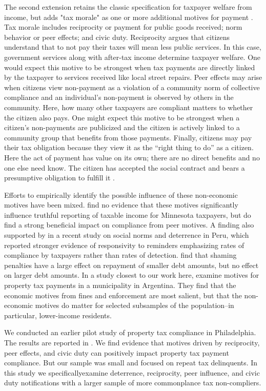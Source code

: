 \documentclass[12pt]{article}
\begin{document}
The second extension retains the classic specification for taxpayer
welfare from income, but adds "tax morale" as one or more additional
motives for payment \cite{Luttmer-14}.  Tax morale includes
reciprocity or payment for public goods received; norm behavior or
peer effects; and civic duty.  Reciprocity argues that citizens
understand that to not pay their taxes will mean less public services.
In this case, government services along with after-tax income
determine taxpayer welfare.  One would expect this motive to be
strongest when tax payments are directly linked by the taxpayer to
services received like local street repairs.  Peer effects may arise
when citizens view non-payment as a violation of a community norm of
collective compliance and an individual's non-payment is observed by
others in the community.  Here, how many other taxpayers are compliant
matters to whether the citizen also pays.  One might
expect this motive to be strongest when a citizen's non-payments are
publicized and the citizen is actively linked to a community group
that benefits from those payments.  Finally, citizens may pay their
tax obligation because they view it as the ``right thing to do'' as a
citizen.  Here the act of payment has value on its own; there are no
direct benefits and no one else need know.  The citizen has accepted
the social contract and bears a presumptive obligation to fulfill it
\cite{Rawls-71}.

Efforts to empirically identify the possible influence of these
non-economic motives have been mixed.   find no
evidence that these motives significantly influence truthful reporting
of taxable income for Minnesota taxpayers, but 
do find a strong beneficial impact on compliance from peer motives.
A finding also supported by  in a recent study on
social norms and deterrence in Peru, which reported stronger 
evidence of responsivity to reminders emphasizing rates of 
compliance by taxpayers rather than rates of detection.
 find that shaming penalties have a large
effect on repayment of smaller debt amounts, but no effect on larger
debt amounts.  In a study closest to our work here, 
examine motives for property tax payments in a municipality in
Argentina.  They find that the economic motives from fines and
enforcement are most salient, but that the non-economic motives do
matter for selected subsamples of the population--in particular,
lower-income residents.

We conducted an earlier pilot study of property tax compliance in
Philadelphia.  The results are reported in .  We
find evidence that motives driven by reciprocity, peer effects, and
civic duty can positively impact property tax payment compliance. But
our sample was small and focused on repeat tax delinquents. 
In this study we specificallyexamine deterrence, reciprocity, 
peer influence, and civic duty notifications with a larger sample 
of more commonplance tax non-compliers.
\end{document}
